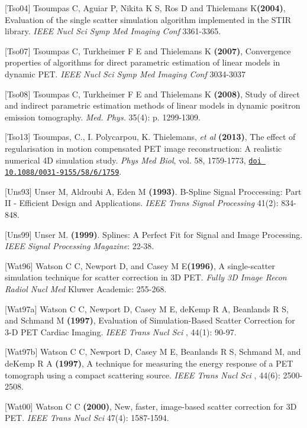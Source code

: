 \documentclass{article}
\def\url#1#2{\mbox{\href{#1}{\tt #2}}}
\begin{document}
{{{{[}Tso04{]} Tsoumpas C, Aguiar P, Nikita K S, Ros D and Thielemans K\textbf{(2004)}, 
Evaluation of the single scatter simulation algorithm implemented in the STIR library. 
\textit { IEEE Nucl Sci Symp Med Imaging Conf } 3361-3365.

{[}Tso07{]} Tsoumpas C, Turkheimer F E and Thielemans K  \textbf{(2007)}, 
Convergence properties of algorithms for direct parametric estimation of linear models in dynamic PET. 
\textit{IEEE Nucl Sci Symp Med Imaging Conf} 3034-3037

{[}Tso08{]} Tsoumpas C, Turkheimer F E and Thielemans K \textbf{(2008)}, Study of direct and indirect 
parametric estimation methods of linear models in dynamic positron emission tomography. \textit{Med. Phys.} 
35(4): p. 1299-1309.

[Tso13] Tsoumpas, C., I.
Polycarpou, K. Thielemans, \textit{et al} \textbf{(2013)}, The effect of
regularisation in motion compensated PET image reconstruction: A realistic
numerical 4D simulation study. \textit{Phys Med Biol}, vol. 58, 1759-1773, 
\url{http://dx.doi.org/10.1088/0031-9155/58/6/1759}{doi 10.1088/0031-9155/58/6/1759}.


{[}Uns93] Unser M, Aldroubi A, Eden M \textbf{(1993)}. B-Spline Signal Proccessing: Part II - Efficient Design and Applications.  \textit{IEEE Trans Signal Processing} 41(2): 834-848.

{[}Uns99] Unser M. \textbf{(1999)}. Splines: A Perfect Fit for Signal and Image Processing. \textit{IEEE Signal Processing Magazine}: 22-38.

{[}Wat96{]} Watson C C, Newport D, and Casey M E\textbf{(1996)}, 
A single-scatter simulation technique for scatter correction in 3D PET. 
\textit { Fully 3D Image Recon Radiol Nucl Med} Kluwer Academic: 255-268. 

{[}Wat97a{]} Watson C C, Newport D, Casey M E, deKemp R A, Beanlands R S, and Schmand M 
\textbf{(1997)}, Evaluation of Simulation-Based Scatter Correction for 3-D PET Cardiac Imaging. 
\textit { IEEE Trans Nucl Sci }, 44(1): 90-97.

{[}Wat97b{]} Watson C C, Newport D, Casey M E, Beanlands R S, Schmand M, and deKemp R A 
\textbf{(1997)}, A technique for measuring the energy response of a PET tomograph using a compact scattering source. 
\textit { IEEE Trans Nucl Sci }, 44(6): 2500-2508.

{[}Wat00{]} Watson C C \textbf{(2000)}, New, faster, image-based scatter correction for 3D PET. 
\textit { IEEE Trans Nucl Sci } 47(4): 1587-1594. 

}}}
\end{document}
